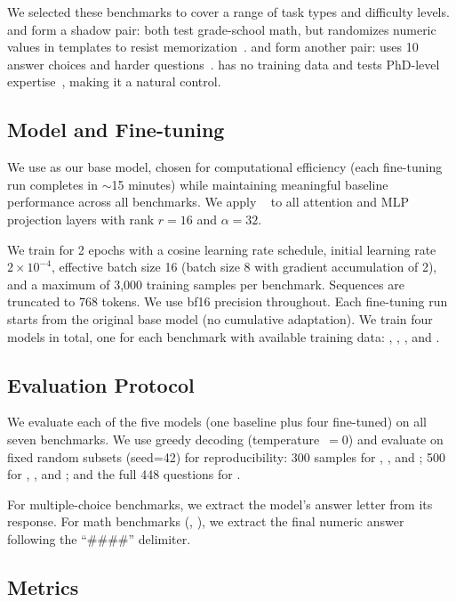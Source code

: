 We selected these benchmarks to cover a range of task types and difficulty levels. \gsmk and \gsmsym form a shadow pair: both test grade-school math, but \gsmsym randomizes numeric values in templates to resist memorization~\citep{mirzadeh2025gsmsymbolic}. \mmlu and \mmlupro form another pair: \mmlupro uses 10 answer choices and harder questions~\citep{tiglab2024mmlupro}. \gpqa has no training data and tests PhD-level expertise~\citep{rein2023gpqa}, making it a natural control.

\subsection{Model and Fine-tuning}
\label{sec:finetuning}

We use \qwen as our base model, chosen for computational efficiency (each fine-tuning run completes in $\sim$15 minutes) while maintaining meaningful baseline performance across all benchmarks. We apply \lora~\citep{hu2022lora} to all attention and MLP projection layers with rank $r=16$ and $\alpha=32$.

 We train for 2 epochs with a cosine learning rate schedule, initial learning rate $2 \times 10^{-4}$, effective batch size 16 (batch size 8 with gradient accumulation of 2), and a maximum of 3{,}000 training samples per benchmark. Sequences are truncated to 768 tokens. We use bf16 precision throughout. Each fine-tuning run starts from the original base model (no cumulative adaptation). We train four models in total, one for each benchmark with available training data: \gsmk, \mmlu, \wino, and \arc.

\subsection{Evaluation Protocol}
\label{sec:eval}

We evaluate each of the five models (one baseline plus four fine-tuned) on all seven benchmarks. We use greedy decoding (temperature~$=0$) and evaluate on fixed random subsets (seed=42) for reproducibility: 300 samples for \gsmk, \gsmsym, and \wino; 500 for \mmlu, \mmlupro, and \arc; and the full 448 questions for \gpqa.

For multiple-choice benchmarks, we extract the model's answer letter from its response. For math benchmarks (\gsmk, \gsmsym), we extract the final numeric answer following the ``\#\#\#\#'' delimiter.

\subsection{Metrics}
\label{sec:metrics}

